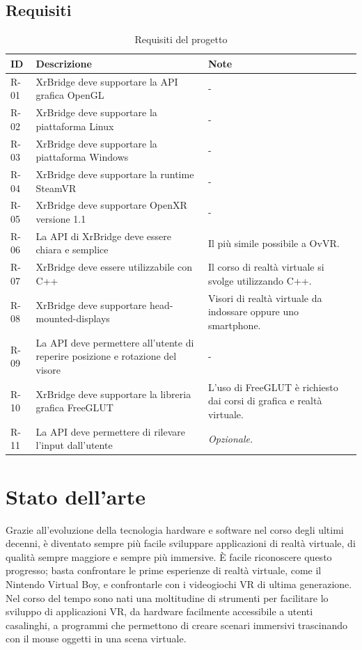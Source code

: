 \documentclass[twoside]{supsistudent}
\begin{document}
\section{Requisiti}

\begin{table}[H]
  \caption{Requisiti del progetto}
  \begin{center}
    \begin{tabular}{ | m{1cm} | m{6cm} | m{6cm} | }
      \hline
      ID   & Descrizione & Note \\
      \hline
      R-01 & XrBridge deve supportare la API grafica OpenGL & - \\
      \hline
      R-02 & XrBridge deve supportare la piattaforma Linux & - \\
      \hline
      R-03 & XrBridge deve supportare la piattaforma Windows & - \\
      \hline
      R-04 & XrBridge deve supportare la runtime SteamVR & - \\
      \hline
      R-05 & XrBridge deve supportare OpenXR versione 1.1 & - \\
      \hline
      R-06 & La API di XrBridge deve essere chiara e semplice & Il più simile possibile a OvVR. \\
      \hline
      R-07 & XrBridge deve essere utilizzabile con C++ & Il corso di realtà virtuale si svolge utilizzando C++. \\
      \hline
      R-08 & XrBridge deve supportare head-mounted-displays & Visori di realtà virtuale da indossare oppure uno smartphone. \\
      \hline
      R-09 & La API deve permettere all'utente di reperire posizione e rotazione del visore & - \\
      \hline
      R-10 & XrBridge deve supportare la libreria grafica FreeGLUT & L'uso di FreeGLUT è richiesto dai corsi di grafica e realtà virtuale. \\
      \hline
      R-11 & La API deve permettere di rilevare l'input dall'utente & \textit{Opzionale.} \\
      \hline
    \end{tabular}
  \end{center}
\end{table}

\chapter{Stato dell'arte}

Grazie all'evoluzione della tecnologia hardware e software nel corso degli ultimi decenni, è diventato sempre più facile sviluppare applicazioni di realtà virtuale, di qualità sempre maggiore e sempre più immersive. È facile riconoscere questo progresso; basta confrontare le prime esperienze di realtà virtuale, come il Nintendo Virtual Boy, e confrontarle con i videogiochi VR di ultima generazione. Nel corso del tempo sono nati una moltitudine di strumenti per facilitare lo sviluppo di applicazioni VR, da hardware facilmente accessibile a utenti casalinghi, a programmi che permettono di creare scenari immersivi trascinando con il mouse oggetti in una scena virtuale.
\end{document}
